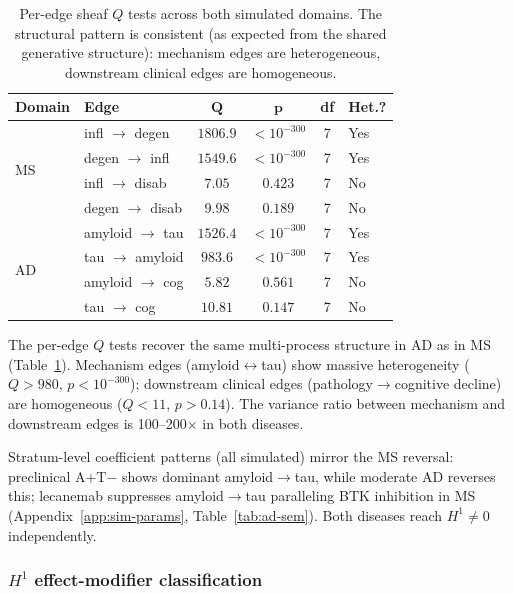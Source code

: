 \documentclass[11pt]{article}
\begin{document}
\begin{table}[t]
\centering
\caption{Per-edge sheaf $Q$ tests across both simulated domains. The structural pattern is consistent (as expected from the shared generative structure): mechanism edges are heterogeneous, downstream clinical edges are homogeneous.}
\label{tab:dag-cross}
\small
\begin{tabular}{@{}llcccl@{}}
\toprule
\textbf{Domain} & \textbf{Edge} & $\boldsymbol{Q}$ & $\boldsymbol{p}$ & \textbf{df} & \textbf{Het.?} \\
\midrule
\multirow{4}{*}{MS} & infl $\to$ degen & $1806.9$ & $< 10^{-300}$ & 7 & Yes \\
& degen $\to$ infl & $1549.6$ & $< 10^{-300}$ & 7 & Yes \\
& infl $\to$ disab & $7.05$ & $0.423$ & 7 & No \\
& degen $\to$ disab & $9.98$ & $0.189$ & 7 & No \\
\midrule
\multirow{4}{*}{AD} & amyloid $\to$ tau & $1526.4$ & $< 10^{-300}$ & 7 & Yes \\
& tau $\to$ amyloid & $983.6$ & $< 10^{-300}$ & 7 & Yes \\
& amyloid $\to$ cog & $5.82$ & $0.561$ & 7 & No \\
& tau $\to$ cog & $10.81$ & $0.147$ & 7 & No \\
\bottomrule
\end{tabular}
\end{table}

The per-edge $Q$ tests recover the same multi-process structure in AD as in MS (Table~\ref{tab:dag-cross}).
Mechanism edges (amyloid$\leftrightarrow$tau) show massive heterogeneity ($Q > 980$, $p < 10^{-300}$); downstream clinical edges (pathology$\to$cognitive decline) are homogeneous ($Q < 11$, $p > 0.14$).
The variance ratio between mechanism and downstream edges is 100--200$\times$ in both diseases.

Stratum-level coefficient patterns (all simulated) mirror the MS reversal: preclinical A+T$-$ shows dominant amyloid$\to$tau, while moderate AD reverses this; lecanemab suppresses amyloid$\to$tau paralleling BTK inhibition in MS (Appendix~\ref{app:sim-params}, Table~\ref{tab:ad-sem}).
Both diseases reach $H^1 \neq 0$ independently.

\subsubsection{$H^1$ effect-modifier classification}
\end{document}
